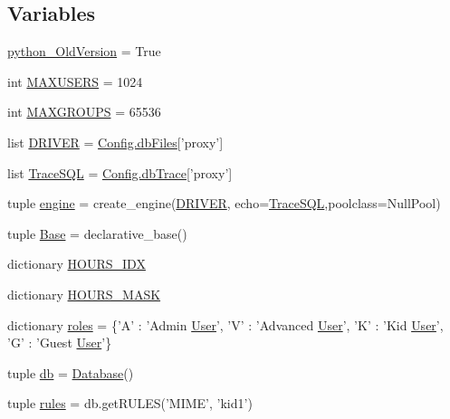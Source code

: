 \subsection*{Variables}
\begin{DoxyCompactItemize}
\item 
\hyperlink{namespacedb__layer_a8fd2ce6ee0abd7a51e1ec8fe295a5a6b}{python\-\_\-\-Old\-Version} = True
\item 
int \hyperlink{namespacedb__layer_a649e55a17a43790deef2961f2ca5c396}{M\-A\-X\-U\-S\-E\-R\-S} = 1024
\item 
int \hyperlink{namespacedb__layer_aa86922899182c14d523d4d72a501089b}{M\-A\-X\-G\-R\-O\-U\-P\-S} = 65536
\item 
list \hyperlink{namespacedb__layer_a7ed1ca76a740523975d0736208ae1f65}{D\-R\-I\-V\-E\-R} = \hyperlink{class_config_1_1_config_a62ca676b07391529a5c1abd433bed57f}{Config.\-db\-Files}\mbox{[}'proxy'\mbox{]}
\item 
list \hyperlink{namespacedb__layer_ad65ee0b7707a738bc9f93587eebd04f6}{Trace\-S\-Q\-L} = \hyperlink{class_config_1_1_config_af7a49b43885faa51f5f5b5687a05120c}{Config.\-db\-Trace}\mbox{[}'proxy'\mbox{]}
\item 
tuple \hyperlink{namespacedb__layer_ad6378d01c39f29fff5832fab694e3a9f}{engine} = create\-\_\-engine(\hyperlink{namespacedb__layer_a7ed1ca76a740523975d0736208ae1f65}{D\-R\-I\-V\-E\-R}, echo=\hyperlink{namespacedb__layer_ad65ee0b7707a738bc9f93587eebd04f6}{Trace\-S\-Q\-L},poolclass=Null\-Pool)
\item 
tuple \hyperlink{namespacedb__layer_abf9d884063baa5841f513855cff66c26}{Base} = declarative\-\_\-base()
\item 
dictionary \hyperlink{namespacedb__layer_afb05786606d962ab2909e3436e531854}{H\-O\-U\-R\-S\-\_\-\-I\-D\-X}
\item 
dictionary \hyperlink{namespacedb__layer_ad6ee299a7034867156fb8100ec6864d7}{H\-O\-U\-R\-S\-\_\-\-M\-A\-S\-K}
\item 
dictionary \hyperlink{namespacedb__layer_a0d5b65488cbaa2ab5d2cdb3c69a98c79}{roles} = \{'A' \-: 'Admin \hyperlink{classdb__layer_1_1_user}{User}', 'V' \-: 'Advanced \hyperlink{classdb__layer_1_1_user}{User}', 'K' \-: 'Kid \hyperlink{classdb__layer_1_1_user}{User}', 'G' \-: 'Guest \hyperlink{classdb__layer_1_1_user}{User}'\}
\item 
tuple \hyperlink{namespacedb__layer_a566ad0b24ebd9510b8017f700f4540b5}{db} = \hyperlink{classdb__layer_1_1_database}{Database}()
\item 
tuple \hyperlink{namespacedb__layer_aa5866ade4f254a145901ec8647407bdb}{rules} = db.\-get\-R\-U\-L\-E\-S('M\-I\-M\-E', 'kid1')
\end{DoxyCompactItemize}


